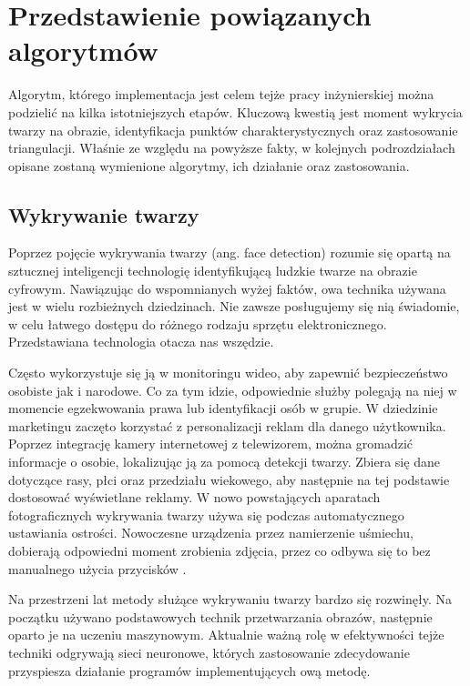 \chapter{Przedstawienie powiązanych algorytmów}
\label{cha:analizaTeoretycznaProblemu}
Algorytm, którego implementacja jest celem tejże pracy inżynierskiej można podzielić na kilka istotniejszych etapów. Kluczową kwestią jest moment wykrycia twarzy na obrazie, identyfikacja punktów charakterystycznych oraz zastosowanie triangulacji. Właśnie ze względu na  powyższe fakty, w kolejnych podrozdziałach opisane zostaną wymienione algorytmy, ich działanie oraz zastosowania. 


\section{Wykrywanie twarzy}
Poprzez pojęcie wykrywania twarzy (ang. face detection) \cite{fDetection} rozumie się opartą na sztucznej inteligencji technologię identyfikującą ludzkie twarze na obrazie cyfrowym. Nawiązując do wspomnianych wyżej faktów, owa technika używana jest w wielu rozbieżnych dziedzinach. Nie zawsze posługujemy się nią świadomie, w celu łatwego dostępu do różnego rodzaju sprzętu elektronicznego. Przedstawiana technologia otacza nas wszędzie.

Często wykorzystuje się ją w monitoringu wideo, aby zapewnić bezpieczeństwo osobiste jak i narodowe. Co za tym idzie, odpowiednie służby polegają na niej w momencie egzekwowania prawa lub identyfikacji osób w grupie. W dziedzinie marketingu zaczęto korzystać z personalizacji reklam dla danego użytkownika. Poprzez integrację kamery internetowej z telewizorem, można gromadzić informacje o osobie, lokalizując ją za pomocą detekcji twarzy. Zbiera się dane dotyczące rasy, płci oraz przedziału wiekowego, aby następnie na tej podstawie dostosować wyświetlane reklamy. W nowo powstających aparatach fotograficznych wykrywania twarzy używa się podczas automatycznego ustawiania ostrości. Nowoczesne urządzenia przez namierzenie uśmiechu, dobierają odpowiedni moment zrobienia zdjęcia, przez co odbywa się to bez manualnego użycia przycisków \cite{fDetection2}.

Na przestrzeni lat metody służące wykrywaniu twarzy bardzo się rozwinęły. Na początku używano podstawowych technik przetwarzania obrazów, następnie oparto je na uczeniu maszynowym. Aktualnie ważną rolę w efektywności tejże techniki odgrywają sieci neuronowe, których zastosowanie zdecydowanie przyspiesza działanie programów implementujących ową metodę.


